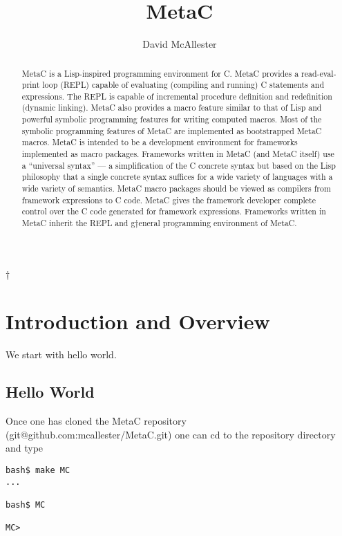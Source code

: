 \documentclass{article}
\title{MetaC}
\author{David McAllester}
\begin{document}
\maketitle
†
\begin{abstract}
  MetaC is a Lisp-inspired programming environment for C. MetaC provides a read-eval-print loop (REPL) capable of evaluating (compiling and running)
  C statements and expressions.  The REPL is capable of incremental procedure definition and redefinition (dynamic linking).  MetaC also provides
  a macro feature similar to that of Lisp and powerful symbolic programming features for writing computed macros.  Most of the symbolic programming features of
  MetaC are implemented as bootstrapped MetaC macros.  MetaC is intended to be a development environment for frameworks implemented as
  macro packages. Frameworks written in MetaC (and MetaC itself) use a ``universal syntax'' ---
  a simplification of the C concrete syntax but based on the Lisp philosophy that a single concrete syntax suffices for a wide variety of languages with
  a wide variety of semantics.  MetaC macro packages
  should be viewed as compilers from framework expressions to C code.  MetaC gives the framework developer complete control over the C code
  generated for framework expressions.  Frameworks written in MetaC inherit the REPL and g†eneral programming environment of MetaC.
\end{abstract}

\newpage

\tableofcontents

\newpage

\section{Introduction and Overview}

We start with hello world.

\subsection{Hello World}

Once one has cloned the MetaC repository (git@github.com:mcallester/MetaC.git) one can cd to the repository directory and type 

\begin{verbatim}
bash$ make MC
...

bash$ MC

MC>
\end{verbatim}
\end{document}

